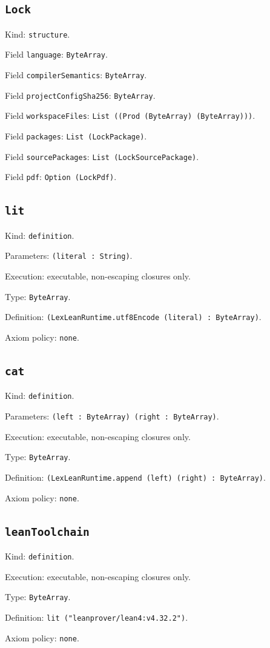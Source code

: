 \documentclass[11pt]{article}
\begin{document}
\subsection*{\texttt{Lock}}
\noindent Kind: \texttt{structure}.\par
\noindent Field \texttt{language}: \texttt{ByteArray}.\par
\noindent Field \texttt{compilerSemantics}: \texttt{ByteArray}.\par
\noindent Field \texttt{projectConfigSha256}: \texttt{ByteArray}.\par
\noindent Field \texttt{workspaceFiles}: \texttt{List ((Prod (ByteArray) (ByteArray)))}.\par
\noindent Field \texttt{packages}: \texttt{List (LockPackage)}.\par
\noindent Field \texttt{sourcePackages}: \texttt{List (LockSourcePackage)}.\par
\noindent Field \texttt{pdf}: \texttt{Option (LockPdf)}.\par
\subsection*{\texttt{lit}}
\noindent Kind: \texttt{definition}.\par
\noindent Parameters: \texttt{(literal : String)}.\par
\noindent Execution: executable, non-escaping closures only.\par
\noindent Type: \texttt{ByteArray}.\par
\noindent Definition: \texttt{(LexLeanRuntime.utf8Encode (literal) : ByteArray)}.\par
\noindent Axiom policy: \texttt{none}.\par
\subsection*{\texttt{cat}}
\noindent Kind: \texttt{definition}.\par
\noindent Parameters: \texttt{(left : ByteArray) (right : ByteArray)}.\par
\noindent Execution: executable, non-escaping closures only.\par
\noindent Type: \texttt{ByteArray}.\par
\noindent Definition: \texttt{(LexLeanRuntime.append (left) (right) : ByteArray)}.\par
\noindent Axiom policy: \texttt{none}.\par
\subsection*{\texttt{leanToolchain}}
\noindent Kind: \texttt{definition}.\par
\noindent Execution: executable, non-escaping closures only.\par
\noindent Type: \texttt{ByteArray}.\par
\noindent Definition: \texttt{lit ("leanprover/lean4:v4.32.2")}.\par
\noindent Axiom policy: \texttt{none}.\par
\end{document}
